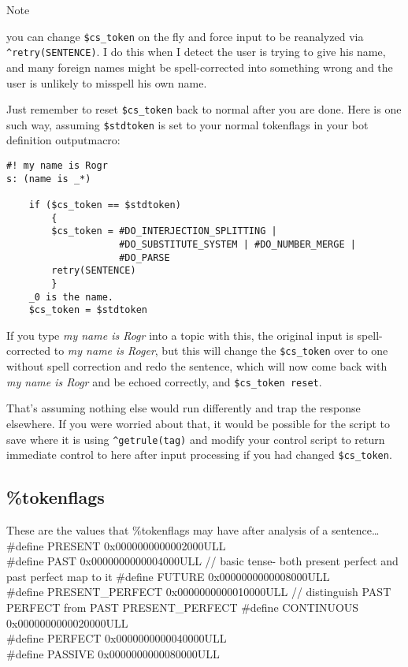 \documentclass[]{article}
\begin{document}
Note

you can change \texttt{\$cs\_token} on the fly and force input to be
reanalyzed via \texttt{\^{}retry(SENTENCE)}. I do this when I detect the
user is trying to give his name, and many foreign names might be
spell-corrected into something wrong and the user is unlikely to
misspell his own name.

Just remember to reset \texttt{\$cs\_token} back to normal after you are
done. Here is one such way, assuming \texttt{\$stdtoken} is set to your
normal tokenflags in your bot definition outputmacro:

\begin{verbatim}
#! my name is Rogr
s: (name is _*)

    if ($cs_token == $stdtoken)
        {
        $cs_token = #DO_INTERJECTION_SPLITTING |
                    #DO_SUBSTITUTE_SYSTEM | #DO_NUMBER_MERGE |
                    #DO_PARSE
        retry(SENTENCE)
        }
    _0 is the name.
    $cs_token = $stdtoken
\end{verbatim}

If you type \emph{my name is Rogr} into a topic with this, the original
input is spell-corrected to \emph{my name is Roger}, but this will
change the \texttt{\$cs\_token} over to one without spell correction and
redo the sentence, which will now come back with \emph{my name is Rogr}
and be echoed correctly, and \texttt{\$cs\_token\ reset}.

That's assuming nothing else would run differently and trap the response
elsewhere. If you were worried about that, it would be possible for the
script to save where it is using \texttt{\^{}getrule(tag)} and modify
your control script to return immediate control to here after input
processing if you had changed \texttt{\$cs\_token}.

\subsection{\%tokenflags}\label{tokenflags}

These are the values that \%tokenflags may have after analysis of a
sentence\ldots{} \#define PRESENT 0x0000000000002000ULL\\
\#define PAST 0x0000000000004000ULL // basic tense- both present perfect
and past perfect map to it \#define FUTURE 0x0000000000008000ULL\\
\#define PRESENT\_PERFECT 0x0000000000010000ULL // distinguish PAST
PERFECT from PAST PRESENT\_PERFECT \#define CONTINUOUS
0x0000000000020000ULL\\
\#define PERFECT 0x0000000000040000ULL\\
\#define PASSIVE 0x0000000000080000ULL
\end{document}

